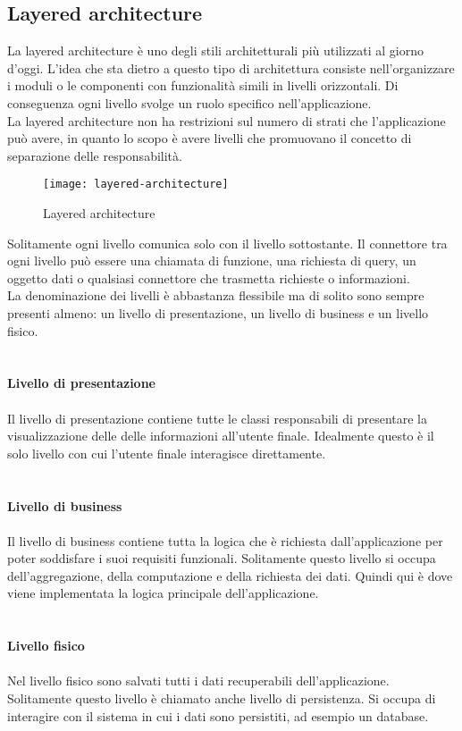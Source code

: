 \subsection{Layered architecture}
La layered architecture è uno degli stili architetturali più utilizzati al giorno d'oggi. L'idea che sta dietro a
questo tipo di architettura consiste nell'organizzare i moduli o le componenti con funzionalità simili
in livelli orizzontali. Di conseguenza ogni livello svolge un ruolo specifico nell'applicazione.
\\
La layered architecture non ha restrizioni sul numero di strati che l'applicazione può avere, in quanto 
lo scopo è avere livelli che promuovano il concetto di separazione delle responsabilità.
\clearpage
\begin{figure}[H]
    \centering
    \texttt{[image: layered-architecture]}
    \caption{Layered architecture}
\end{figure}
\leavevmode\newline
Solitamente ogni livello comunica solo con il livello sottostante. Il connettore tra ogni livello può 
essere una chiamata di funzione, una richiesta di query, un oggetto dati o qualsiasi connettore che
trasmetta richieste o informazioni.
\\
La denominazione dei livelli è abbastanza flessibile ma di solito sono sempre presenti almeno: un livello di presentazione, un livello
di business e un livello fisico.
\\\\\\
\textbf{Livello di presentazione}
\\\\
Il livello di presentazione contiene tutte le classi responsabili di presentare la visualizzazione delle
delle informazioni all'utente finale. Idealmente questo è il solo livello con cui l'utente finale 
interagisce direttamente.
\\\\\\
\textbf{Livello di business}
\\\\
Il livello di business contiene tutta la logica che è richiesta dall'applicazione per poter soddisfare i 
suoi requisiti funzionali. Solitamente questo livello si occupa dell'aggregazione, della computazione
e della richiesta dei dati. Quindi qui è dove viene implementata la logica principale dell'applicazione.
\\\\\\
\textbf{Livello fisico}
\\\\
Nel livello fisico sono salvati tutti i dati recuperabili dell'applicazione. Solitamente questo livello è chiamato
anche livello di persistenza. Si occupa di interagire con il sistema in cui i dati 
sono persistiti, ad esempio un database.
